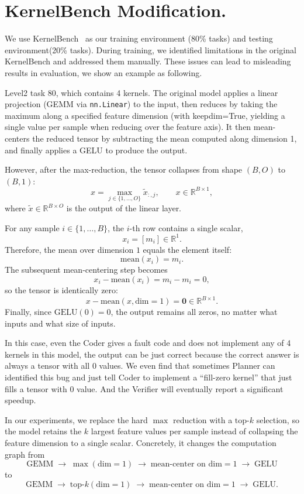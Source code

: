 \newpage
\appendix
\onecolumn
\section{KernelBench Modification.}
\label{app:bench}
We use KernelBench~\cite{kernelbench} as our training environment (80\% tasks) and testing environment(20\% tasks). During training, we identified limitations in the original KernelBench and addressed them manually. These issues can lead to misleading results in evaluation, we show an example as following.

Level2 task 80, which contains 4 kernels. The original model applies a linear projection (GEMM via \texttt{nn.Linear}) to the input, then reduces by taking the maximum along a specified feature dimension (with keepdim=True, yielding a single value per sample when reducing over the feature axis). It then mean-centers the reduced tensor by subtracting the mean computed along dimension 1, and finally applies a GELU to produce the output.

However, after the max-reduction, the tensor collapses from shape $(B, O)$ to $(B,1)$:
\[
x = \max_{j \in \{1,\dots,O\}} \tilde{x}_{:,j}, \qquad x \in \mathbb{R}^{B \times 1},
\]
where $\tilde{x} \in \mathbb{R}^{B \times O}$ is the output of the linear layer.

For any sample $i \in \{1,\dots,B\}$, the $i$-th row contains a single scalar,
\[
x_i = [m_i] \in \mathbb{R}^{1}.
\]
Therefore, the mean over dimension $1$ equals the element itself:
\[
\mathrm{mean}(x_i) = m_i.
\]
The subsequent mean-centering step becomes
\[
x_i - \mathrm{mean}(x_i) = m_i - m_i = 0,
\]
so the tensor is identically zero:
\[
x - \mathrm{mean}(x, \mathrm{dim}=1) = \mathbf{0} \in \mathbb{R}^{B \times 1}.
\]
Finally, since $\mathrm{GELU}(0)=0$, the output remains all zeros, no matter what inputs and what size of inputs. 

In this case, even the Coder gives a fault code and does not implement any of 4 kernels in this model, the output can be just correct because the correct answer is always a tensor with all 0 values. We even find that sometimes Planner can identified this bug and just tell Coder to implement a “fill-zero kernel” that just fills a tensor with 0 value. And the Verifier will eventually report a significant speedup. 

In our experiments, we replace the hard $\max$ reduction with a $\mathrm{top}\text{-}k$ selection, so the model retains the $k$ largest feature values per sample instead of collapsing the feature dimension to a single scalar. Concretely, it changes the computation graph from
\[
\text{GEMM} \;\rightarrow\; \max(\mathrm{dim}=1) \;\rightarrow\; \text{mean-center on } \mathrm{dim}=1 \;\rightarrow\; \mathrm{GELU}
\]
to
\[
\text{GEMM} \;\rightarrow\; \mathrm{top}\text{-}k(\mathrm{dim}=1) \;\rightarrow\; \text{mean-center on } \mathrm{dim}=1 \;\rightarrow\; \mathrm{GELU}.
\]

